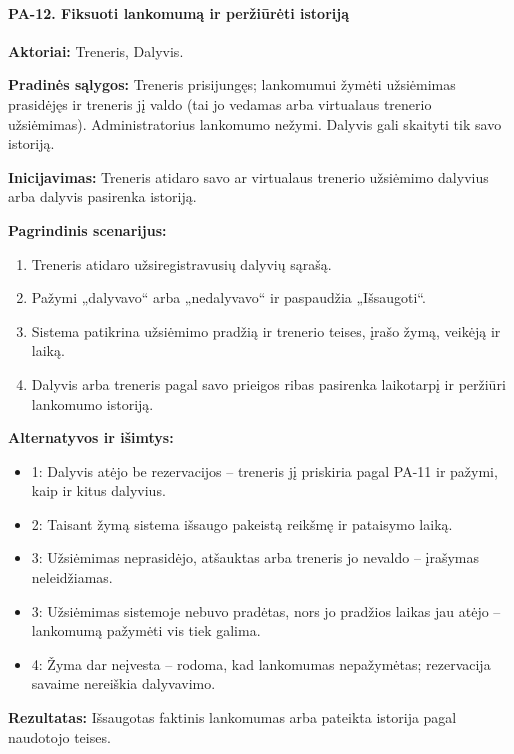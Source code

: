 \paragraph{PA-12. Fiksuoti lankomumą ir peržiūrėti istoriją}\mbox{}\par
\textbf{Aktoriai:} Treneris, Dalyvis.\par
\textbf{Pradinės sąlygos:} Treneris prisijungęs; lankomumui žymėti užsiėmimas prasidėjęs ir treneris jį valdo (tai jo vedamas arba virtualaus trenerio užsiėmimas). Administratorius lankomumo nežymi. Dalyvis gali skaityti tik savo istoriją.\par
\textbf{Inicijavimas:} Treneris atidaro savo ar virtualaus trenerio užsiėmimo dalyvius arba dalyvis pasirenka istoriją.\par
\textbf{Pagrindinis scenarijus:}
\begin{enumerate}
\item Treneris atidaro užsiregistravusių dalyvių sąrašą.
\item Pažymi „dalyvavo“ arba „nedalyvavo“ ir paspaudžia „Išsaugoti“.
\item Sistema patikrina užsiėmimo pradžią ir trenerio teises, įrašo žymą, veikėją ir laiką.
\item Dalyvis arba treneris pagal savo prieigos ribas pasirenka laikotarpį ir peržiūri lankomumo istoriją.
\end{enumerate}
\textbf{Alternatyvos ir išimtys:}
\begin{itemize}
\item 1: Dalyvis atėjo be rezervacijos -- treneris jį priskiria pagal PA-11 ir pažymi, kaip ir kitus dalyvius.
\item 2: Taisant žymą sistema išsaugo pakeistą reikšmę ir pataisymo laiką.
\item 3: Užsiėmimas neprasidėjo, atšauktas arba treneris jo nevaldo -- įrašymas neleidžiamas.
\item 3: Užsiėmimas sistemoje nebuvo pradėtas, nors jo pradžios laikas jau atėjo -- lankomumą pažymėti vis tiek galima.
\item 4: Žyma dar neįvesta -- rodoma, kad lankomumas nepažymėtas; rezervacija savaime nereiškia dalyvavimo.
\end{itemize}
\textbf{Rezultatas:} Išsaugotas faktinis lankomumas arba pateikta istorija pagal naudotojo teises.\par
{}
